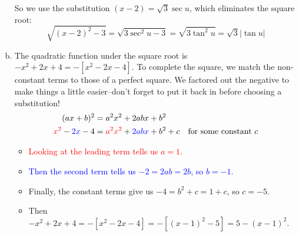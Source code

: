 \begin{solution}
\begin{enumerate}[(a)]
So we use the substitution $(x-2) = \sqrt{3}\sec u$, which eliminates the square root:
\[\sqrt{\left(x-2\right)^2-3}=\sqrt{3\sec^2 u - 3} = \sqrt{3\tan^2 u} = \sqrt{3}|\tan u|\]
%
\item 
The quadratic function under the square root is $-x^2+2x+4=-[x^2-2x-4]$. To complete the square, we match the non-constant terms to those of a perfect square. We factored out the negative to make things a little easier--don't forget to put it back in before choosing a substitution!
\begin{align*}
(ax+b)^2&=a^2x^2+2abx+b^2\\
\textcolor{red}{x^2}-\textcolor{blue}{2x}-4&=\textcolor{red}{a^2x^2} + \textcolor{blue}{2abx} +b^2 + c \quad\mbox{for some constant $c$}
\end{align*}
\begin{itemize}
\item \textcolor{red}{Looking at the leading term tells us $a=1$. }
\item \textcolor{blue}{Then the second term tells us $-2=2ab=2b$, so $b=-1$.}
\item Finally, the constant terms give us $-4=b^2+c=1+c$, so $c=-5$.
\item Then $-x^2+2x+4 = -[x^2-2x-4]=-[(x-1)^2-5]=5-(x-1)^2$.
\end{itemize}


\end{enumerate}
\end{solution}
